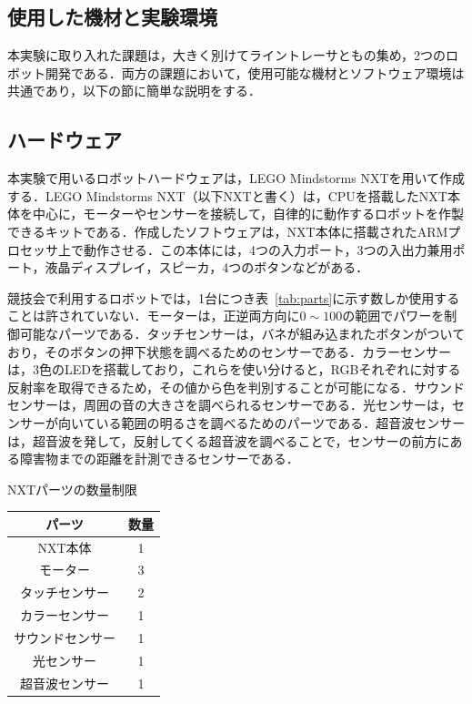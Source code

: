 \begin{multicols*}{2}
\section{使用した機材と実験環境}%
本実験に取り入れた課題は，大きく別けてライントレーサともの集め，2つのロボット開発である．両方の課題において，使用可能な機材とソフトウェア環境は共通であり，以下の節に簡単な説明をする．

\subsection{ハードウェア}
本実験で用いるロボットハードウェアは，LEGO Mindstorms NXTを用いて作成する．LEGO Mindstorms NXT（以下NXTと書く）は，CPUを搭載したNXT本体を中心に，モーターやセンサーを接続して，自律的に動作するロボットを作製できるキットである．作成したソフトウェアは，NXT本体に搭載されたARMプロセッサ上で動作させる．この本体には，4つの入力ポート，3つの入出力兼用ポート，液晶ディスプレイ，スピーカ，4つのボタンなどがある．

競技会で利用するロボットでは，1台につき表~\ref{tab:parts}に示す数しか使用することは許されていない．モーターは，正逆両方向に$0\sim100$の範囲でパワーを制御可能なパーツである．タッチセンサーは，バネが組み込まれたボタンがついており，そのボタンの押下状態を調べるためのセンサーである．カラーセンサーは，3色のLEDを搭載しており，これらを使い分けると，RGBそれぞれに対する反射率を取得できるため，その値から色を判別することが可能になる．サウンドセンサーは，周囲の音の大きさを調べられるセンサーである．光センサーは，センサーが向いている範囲の明るさを調べるためのパーツである．超音波センサーは，超音波を発して，反射してくる超音波を調べることで，センサーの前方にある障害物までの距離を計測できるセンサーである．
\begin{center}
\begin{tablehere}
	\caption{NXTパーツの数量制限}
	\label{tab:parts}
	\begin{tabular}{c|c}
	\doubleRule
	パーツ&数量\\\hline
	NXT本体&1\\\hline
	モーター&3\\\hline
	タッチセンサー&2\\\hline
	カラーセンサー&1\\\hline
	サウンドセンサー&1\\\hline
	光センサー&1\\\hline
	超音波センサー&1\\\hline
	\bottomrule
	\end{tabular}
\end{tablehere}
\end{center}


\end{multicols*}
